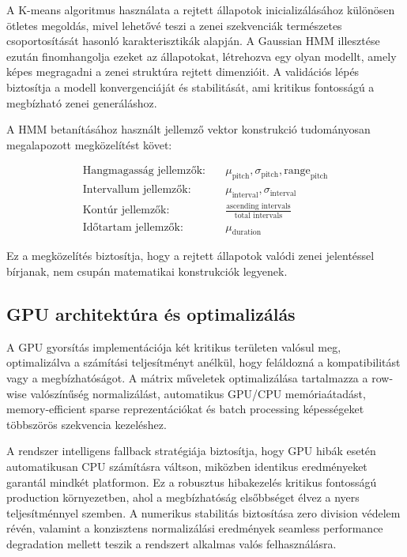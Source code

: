 A K-means algoritmus használata a rejtett állapotok inicializálásához különösen ötletes megoldás, mivel lehetővé teszi a zenei szekvenciák természetes csoportosítását hasonló karakterisztikák alapján. A Gaussian HMM illesztése ezután finomhangolja ezeket az állapotokat, létrehozva egy olyan modellt, amely képes megragadni a zenei struktúra rejtett dimenzióit. A validációs lépés biztosítja a modell konvergenciáját és stabilitását, ami kritikus fontosságú a megbízható zenei generáláshoz.

A HMM betanításához használt jellemző vektor konstrukció tudományosan megalapozott megközelítést követ:

\begin{align}
\text{Hangmagasság jellemzők:} \quad &\mu_{\text{pitch}}, \sigma_{\text{pitch}}, \text{range}_{\text{pitch}} \\
\text{Intervallum jellemzők:} \quad &\mu_{\text{interval}}, \sigma_{\text{interval}} \\
\text{Kontúr jellemzők:} \quad &\frac{\text{ascending intervals}}{\text{total intervals}} \\
\text{Időtartam jellemzők:} \quad &\mu_{\text{duration}}
\end{align}

Ez a megközelítés biztosítja, hogy a rejtett állapotok valódi zenei jelentéssel bírjanak, nem csupán matematikai konstrukciók legyenek.

\subsection{GPU architektúra és optimalizálás}

A GPU gyorsítás implementációja két kritikus területen valósul meg, optimalizálva a számítási teljesítményt anélkül, hogy feláldozná a kompatibilitást vagy a megbízhatóságot. A mátrix műveletek optimalizálása tartalmazza a row-wise valószínűség normalizálást, automatikus GPU/CPU memóriaátadást, memory-efficient sparse reprezentációkat és batch processing képességeket többszörös szekvencia kezeléshez.

A rendszer intelligens fallback stratégiája biztosítja, hogy GPU hibák esetén automatikusan CPU számításra váltson, miközben identikus eredményeket garantál mindkét platformon. Ez a robusztus hibakezelés kritikus fontosságú production környezetben, ahol a megbízhatóság elsőbbséget élvez a nyers teljesítménnyel szemben. A numerikus stabilitás biztosítása zero division védelem révén, valamint a konzisztens normalizálási eredmények seamless performance degradation mellett teszik a rendszert alkalmas valós felhasználásra.

